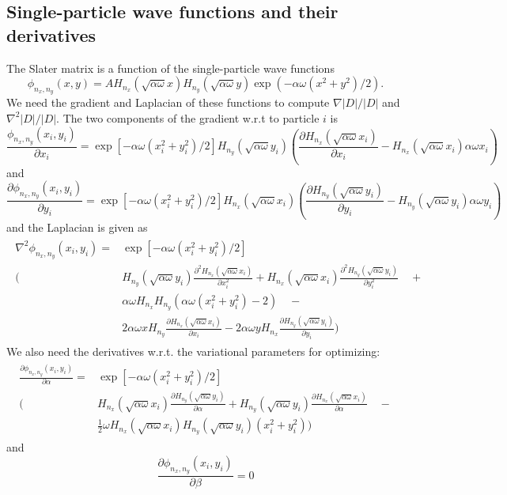 \documentclass[english, a4paper]{article}
\begin{document}
\subsection{Single-particle wave functions and their derivatives} \label{app:appendixA2}
The Slater matrix is a function of the single-particle wave functions
\begin{equation}
 \phi_{n_x,n_y}(x,y) = AH_{n_x}(\sqrt{\alpha\omega}x)
 H_{n_y}(\sqrt{\alpha\omega}y)\exp(-\alpha\omega(x^2+y^2)/2).
\end{equation}
We need the gradient and Laplacian of these functions to compute $\nabla |D| / |D|$ 
and $\nabla^2 |D| / |D|$. The two components of the gradient w.r.t to particle $i$ is
\begin{equation}
 \frac{\phi_{n_x,n_y}(x_i,y_i)}{\partial x_i} = \exp{[-\alpha\omega(x_i^2 + y_i^2)/2]}H_{n_y}(\sqrt{\alpha\omega}y_i)
 \left( \frac{\partial H_{n_x}(\sqrt{\alpha\omega}x_i)}{\partial x_i} - 
 H_{n_x}(\sqrt{\alpha\omega}x_i)\alpha\omega x_i \right)
\end{equation}
and 
\begin{equation}
 \frac{\partial \phi_{n_x,n_y}(x_i,y_i)}{\partial y_i} = \exp{[-\alpha\omega(x_i^2 + y_i^2)/2]}
 H_{n_x}(\sqrt{\alpha\omega}x_i)
 \left( \frac{\partial H_{n_y}(\sqrt{\alpha\omega}y_i)}{\partial y_i} - 
 H_{n_y}(\sqrt{\alpha\omega}y_i)\alpha\omega y_i \right)
\end{equation}
and the Laplacian is given as
\begin{align}
\begin{split}
 \nabla^2\phi_{n_x,n_y}(x_i,y_i) = &\exp{[-\alpha\omega(x_i^2 + y_i^2)/2]} \\
 \Biggr(&H_{n_y}(\sqrt{\alpha\omega}y_i) \frac{\partial^2 H_{n_x}(\sqrt{\alpha\omega}x_i)}{\partial x_i^2} + 
 H_{n_x}(\sqrt{\alpha\omega}x_i)\frac{\partial^2 H_{n_y}(\sqrt{\alpha\omega}y_i)}{\partial y_i^2} \quad+ \\
 &\alpha\omega H_{n_x}H_{n_y}(\alpha\omega(x_i^2 + y_i^2) - 2)\quad - \\
 &2\alpha\omega x H_{n_y}\frac{\partial H_{n_x}(\sqrt{\alpha\omega}x_i)}{\partial x_i} - 
 2\alpha\omega y H_{n_x}\frac{\partial H_{n_y}(\sqrt{\alpha\omega}y_i)}{\partial y_i} \Biggr)
\end{split}
\end{align}
We also need the derivatives w.r.t. the variational parameters for optimizing:
\begin{align}
\begin{split}
 \frac{\partial \phi_{n_x,n_y}(x_i, y_i)}{\partial \alpha} = 
 &\exp[-\alpha\omega(x_i^2 + y_i^2)/2] \\
 \Biggr(&H_{n_x}(\sqrt{\alpha\omega}x_i)\frac{\partial H_{n_y}(\sqrt{\alpha\omega}y_i)}{\partial \alpha} + 
 H_{n_y}(\sqrt{\alpha\omega}y_i)\frac{\partial H_{n_x}(\sqrt{\alpha\omega}x_i)}{\partial \alpha} \quad- \\
 &\frac{1}{2}\omega H_{n_x}(\sqrt{\alpha\omega}x_i)H_{n_y}(\sqrt{\alpha\omega}y_i)(x_i^2 + y_i^2)\Biggr)
\end{split}
\end{align}
and 
\begin{equation}
 \frac{\partial \phi_{n_x,n_y}(x_i, y_i)}{\partial \beta} = 0
\end{equation}
\end{document}

